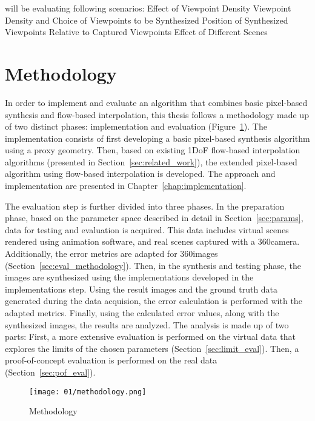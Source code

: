 will be evaluating following scenarios:
Effect of Viewpoint Density
Viewpoint Density and Choice of Viewpoints to be Synthesized
Position of Synthesized Viewpoints Relative to Captured Viewpoints
Effect of Different Scenes


\section*{Methodology}
In order to implement and evaluate an algorithm that combines basic pixel-based synthesis and flow-based interpolation, this thesis follows a methodology made up of two distinct phases: implementation and evaluation (Figure~\ref{fig:methodology}). The implementation consists of first developing a basic pixel-based synthesis algorithm using a proxy geometry. Then, based on existing 1DoF flow-based interpolation algorithms (presented in Section~\ref{sec:related_work}), the extended pixel-based algorithm using flow-based interpolation is developed. The approach and implementation are presented in Chapter~\ref{chap:implementation}.

The evaluation step is further divided into three phases. In the preparation phase, based on the parameter space described in detail in Section~\ref{sec:params}, data for testing and evaluation is acquired. This data includes virtual scenes rendered using animation software, and real scenes captured with a 360\degree camera. Additionally, the error metrics are adapted for 360\degree images (Section~\ref{sec:eval_methodology}).
Then, in the synthesis and testing phase, the images are synthesized using the implementations developed in the implementations step. Using the result images and the ground truth data generated during the data acquision, the error calculation is performed with the adapted metrics.
Finally, using the calculated error values, along with the synthesized images, the results are analyzed. The analysis is made up of two parts: First, a more extensive evaluation is performed on the virtual data that explores the limits of the chosen parameters (Section~\ref{sec:limit_eval}). Then, a proof-of-concept evaluation is performed on the real data (Section~\ref{sec:pof_eval}).

\begin{figure}
		\centering
		\texttt{[image: 01/methodology.png]}
		\caption{Methodology}
		\label{fig:methodology}
\end{figure}


